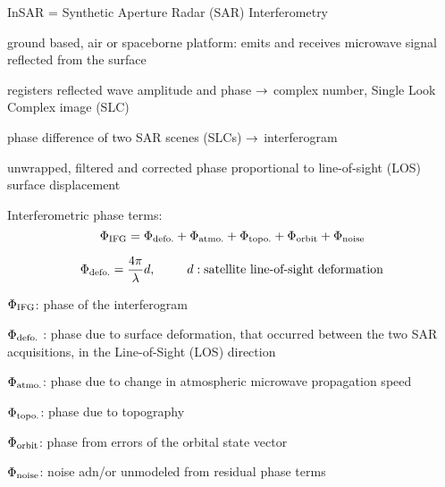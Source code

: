 \documentclass[a0, 18pt, landscape]{a0poster}
\begin{document}
\vspace{5pt}

\columnsep=30pt

\large\bfseries

\begin{multicols}{3}

    \bitz
        \item InSAR = Synthetic Aperture Radar (SAR) Interferometry
        \item ground based, air or spaceborne platform: emits and receives
              microwave signal reflected from the surface
        \item registers reflected wave amplitude and phase $\rightarrow$ complex number, Single Look Complex image (SLC)
        \item phase difference of two SAR scenes (SLCs) $\rightarrow$ interferogram
        \item unwrapped, filtered and corrected phase proportional to line-of-sight (LOS) surface displacement
    \eitz
    
    Interferometric phase terms:
    \[
        \Phi_{\text{IFG}} = \Phi_{\text{defo.}} + \Phi_{\text{atmo.}} + \Phi_{\text{topo.}} + \Phi_{\text{orbit}} + \Phi_{\text{noise}}
    \]
    
    \[
        \Phi_{\text{defo.}} = \frac{4\pi}{\lambda} d, \hspace{25pt} d: \text{satellite line-of-sight deformation}
    \]
    
    \bcent
    \effig
    \emini
    \emini
    \ecent
    \vspace{10pt}
    
    \bitz
        \item $\Phi_{\text{IFG}}$: phase of the interferogram 
        \item $\Phi_{\text{defo.}}$ : phase due to surface deformation, that occurred between the two SAR acquisitions, in the Line-of-Sight (LOS) direction
        \item $\Phi_{\text{atmo.}}$: phase due to change in atmospheric microwave propagation speed
        \item $\Phi_{\text{topo.}}$: phase due to topography
        \item $\Phi_{\text{orbit}}$: phase from errors of the orbital state vector
        \item $\Phi_{\text{noise}}$: noise adn/or unmodeled from residual phase terms
    \eitz
    

\end{multicols}
\end{document}
